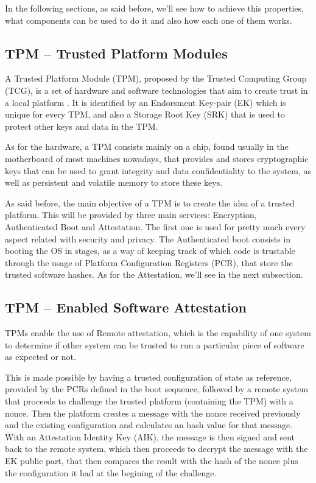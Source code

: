 In the following sections, as said before, we'll see how to achieve this properties, what components can be used to do it and also how each one of them works.

\subsection{TPM – Trusted Platform Modules }
\label{ssec:tpm_intro}

A Trusted Platform Module (TPM), proposed by the Trusted Computing Group (TCG), is a set of hardware and software technologies that aim to create trust in a local platform \cite{sgxCloudThesis}. It is identified by an Endorsment Key-pair (EK) which is unique for every TPM, and also a Storage Root Key (SRK) that is used to protect other keys and data in the TPM. 

As for the hardware, a TPM consists mainly on a chip, found usually in the motherboard of most machines nowadays, that provides and stores cryptographic keys that can be used to grant integrity and data confidentiality to the system, as well as persistent and volatile memory to store these keys. 

As said before, the main objective of a TPM is to create the idea of a trusted platform. This will be  provided by three main services: Encryption, Authenticated Boot and Attestation. The first one is used for pretty much every aspect related with security and privacy. The Authenticated boot consists in booting the OS in stages, as a way of keeping track of which code is trustable through the usage of Platform Configuration Registers (PCR), that store the trusted software hashes. As for the Attestation, we'll see in the next subsection.


\subsection{TPM – Enabled Software Attestation}
\label{ssec:tpm_attest}

TPMs enable the use of Remote attestation, which is the capability of one system to determine if other system can be trusted to run a particular piece of software as expected or not.

This is made possible by having a trusted configuration of state as reference, provided by the PCRs defined in the boot sequence, followed by a remote system that proceeds to challenge the trusted platform (containing the TPM) with a nonce. Then the platform creates a message with the nonce received previously and the existing configuration and calculates an hash value for that message. With an Attestation Identity Key (AIK), the message is then signed and sent back to the remote system, which then proceeds to decrypt the message with the EK public part, that then compares the result with the hash of the nonce plus the configuration it had at the begining of the challenge. 

